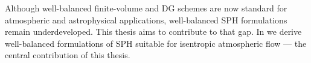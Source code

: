\documentclass[../main.tex]{subfiles}
\begin{document}
Although well-balanced finite-volume and DG schemes are now standard for atmospheric and astrophysical applications, well-balanced SPH formulations remain underdeveloped. This thesis aims to contribute to that gap. In  we derive well-balanced formulations of SPH suitable for isentropic atmospheric flow --- the central contribution of this thesis.
\end{document}
